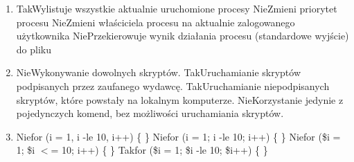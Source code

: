 \begin{enumerate}
		\newpage
		\item {}%
		{Tak}{Wylistuje wszystkie aktualnie uruchomione procesy}%
		{Nie}{Zmieni priorytet procesu}%
		{Nie}{Zmieni właściciela procesu na aktualnie zalogowanego użytkownika}%
		{Nie}{Przekierowuje wynik działania procesu (standardowe wyjście) do pliku}
		\item {}%
		{Nie}{Wykonywanie dowolnych skryptów.}%
		{Tak}{Uruchamianie skryptów podpisanych przez zaufanego wydawcę.}%
		{Tak}{Uruchamianie niepodpisanych skryptów, które powstały na lokalnym komputerze.}%
		{Nie}{Korzystanie jedynie z pojedynczych komend, bez możliwości uruchamiania skryptów.}
		\item {}%
		{Nie}{for (i = 1, i -le 10, i++) \{ \}}%
		{Nie}{for (i = 1; i -le 10; i++) \{ \}}%
		{Nie}{for (\$i = 1; \$i $ < $= 10; i++) \{ \}}%
		{Tak}{for (\$i = 1; \$i -le 10; \$i++) \{ \}}
		
		
		
	\end{enumerate}